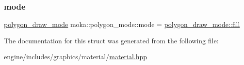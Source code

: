 \mbox{\label{structmoka_1_1polygon__mode_aac54ec71e810b984f72b4a76f2724ba2}} 
\subsubsection{\texorpdfstring{mode}{mode}}
{\footnotesize\ttfamily \mbox{\hyperlink{namespacemoka_ab11ab0363880d78783c5e5b4d5c28a8b}{polygon\+\_\+draw\+\_\+mode}} moka\+::polygon\+\_\+mode\+::mode = \mbox{\hyperlink{namespacemoka_ab11ab0363880d78783c5e5b4d5c28a8baa552c74784b3a82177bca6c8adde0efb}{polygon\+\_\+draw\+\_\+mode\+::fill}}}



The documentation for this struct was generated from the following file\+:\begin{DoxyCompactItemize}
\item 
engine/includes/graphics/material/\mbox{\hyperlink{material_8hpp}{material.\+hpp}}\end{DoxyCompactItemize}

